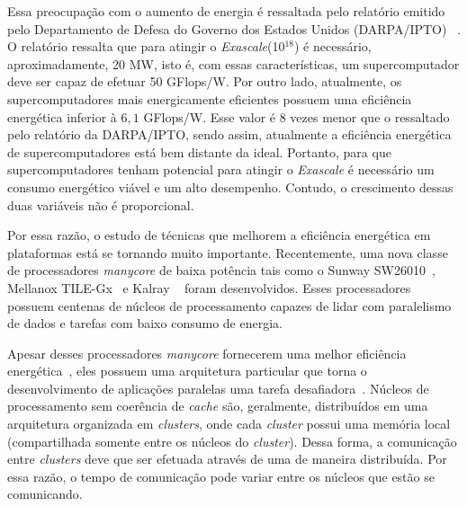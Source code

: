 
Essa preocupação com o aumento de energia é ressaltada pelo relatório emitido pelo Departamento de Defesa do Governo dos Estados Unidos (DARPA/IPTO) ~\cite{Kogge2008}. O relatório ressalta que para atingir o \textit{Exascale}(10$^{18}$) é necessário, aproximadamente, 20 MW, isto é, com essas características, um supercomputador deve ser capaz de efetuar 50 GFlops/W. Por outro lado, atualmente, os supercomputadores mais energicamente eficientes possuem uma eficiência energética inferior à $6,1$ GFlops/W. Esse valor é 8 vezes menor que o ressaltado pelo relatório da DARPA/IPTO, sendo assim, atualmente a eficiência energética de supercomputadores está bem distante da ideal. Portanto, para que supercomputadores tenham potencial para atingir o \textit{Exascale} é necessário um consumo energético viável e um alto desempenho. Contudo, o crescimento dessas duas variáveis não é proporcional.


Por essa razão, o estudo de técnicas que melhorem a eficiência energética em plataformas \hpc está se tornando muito importante.  Recentemente, uma nova classe de processadores \textit{manycore} de baixa potência tais como o Sunway SW26010~\cite{sunway:2016}, Mellanox TILE-Gx~\cite{Valero:2012} e Kalray \mppa~\cite{Castro-IA3:2013} foram desenvolvidos. Esses processadores possuem centenas de núcleos de processamento capazes de lidar com paralelismo de dados e tarefas com baixo consumo de energia.

Apesar desses processadores \textit{manycore} fornecerem uma melhor eficiência energética~\cite{Castro-IA3-JPDC:2014}, eles possuem uma arquitetura particular que torna o desenvolvimento de aplicações paralelas uma tarefa desafiadora~\cite{Varghese14,Castro-PARCO:2016,Castro-SBAC-PAD:2014}. Núcleos de processamento sem coerência de \textit{cache} são, geralmente, distribuídos em uma arquitetura organizada em \textit{clusters}, onde cada \textit{cluster} possui uma memória local (compartilhada somente entre os núcleos do \textit{cluster}). Dessa forma, a comunicação entre \textit{clusters} deve que ser efetuada através de uma \noc de maneira distribuída.
Por essa razão, o tempo de comunicação pode variar entre os núcleos que estão se comunicando.

